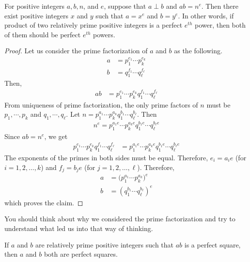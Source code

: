 \documentclass{subfile}
\begin{document}
	\begin{theorem}
		For positive integers $a, b, n$, and $e$, suppose that $a\perp b$ and $ab=n^e$. Then there exist positive integers $x$ and $y$ such that $a=x^e$ and $b=y^e$. In other  words, if product of two relatively prime positive integers is a perfect $e^{th}$ power, then both of them should be perfect $e^{th}$ powers. \label{thm:copower}
	\end{theorem}

	\begin{proof}
		Let us consider the prime factorization of $a$ and $b$ as the following.
		\begin{align*}
			a
				& = p_1^{e_1}\cdots p_k^{e_k}\\
			b
				& = q_1^{f_1}\cdots q_\ell^{f_\ell}
		\end{align*}
		Then,
		\begin{align*}
			ab &= p_1^{e_1}\cdots p_k^{e_k}q_1^{f_1}\cdots q_\ell^{f_\ell}
		\end{align*}
		From uniqueness of prime factorization, the only prime factors of $n$ must be $p_1,\cdots,p_k$ and $q_1,\cdots,q_\ell$. Let $n = p_1^{a_1}\cdots p_k^{a_k}q_1^{b_1}\cdots q_\ell^{b_\ell}$. Then
		\begin{align*}
			n^e  = p_1^{a_1e}\cdots p_k^{a_ke}q_1^{b_1e}\cdots q_\ell^{b_\ell e}
		\end{align*}
		Since $ab=n^e$, we get
		\begin{align*}
			p_1^{e_1}\cdots p_k^{e_k}q_1^{f_1}\cdots q_\ell^{f_\ell} & = p_1^{a_1e}\cdots p_k^{a_ke}q_1^{b_1e}\cdots q_\ell^{b_\ell e}
		\end{align*}
		The exponents of the primes in both sides must be equal. Therefore, $e_i=a_ie$ (for $i=1,2,\ldots,k$) and $f_j=b_je$ (for $j=1,2,\ldots,\ell$). Therefore,
		\begin{align*}
			a
				& = \Big(p_1^{a_1}\cdots p_k^{a_k}\Big)^e\\
			b
				& = \left(q_1^{b_1}\cdots q_\ell^{b_\ell}\right)^e
		\end{align*}
		which proves the claim.
	\end{proof}

	\begin{note}
		You should think about why we considered the prime factorization and try to understand what led us into that way of thinking.
	\end{note}

	\begin{corollary}
		If $a$ and $b$ are relatively prime positive integers such that $ab$ is a perfect square, then $a$ and $b$ both are perfect squares.\label{cor:sqr}
	\end{corollary}
\end{document}
